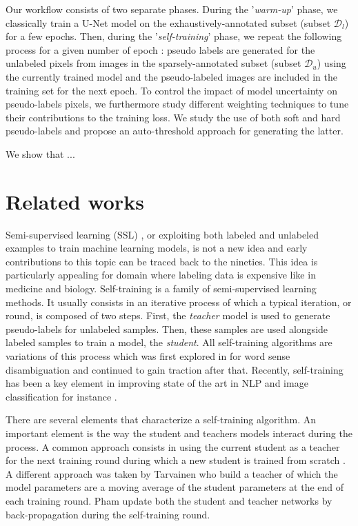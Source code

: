 Our workflow consists of two separate phases. During the '\textit{warm-up}' phase, we classically train a U-Net model on the exhaustively-annotated subset (subset $\mathcal{D}_l$) for a few epochs. Then, during the '\textit{self-training}' phase, we repeat the following process for a given number of epoch : pseudo labels are generated for the unlabeled pixels from images in the sparsely-annotated subset (subset $\mathcal{D}_u$) using the currently trained model and the pseudo-labeled images are included in the training set for the next epoch. To control the impact of model uncertainty on pseudo-labels pixels, we furthermore study different weighting techniques to tune their contributions to the training loss. We study the use of both soft and hard pseudo-labels and propose an auto-threshold approach for generating the latter. 

We show that ... 


\section{Related works}
\label{sec:relatedworks}

Semi-supervised learning (SSL) \cite{zhu2005semi, van2020survey}, or exploiting both labeled and unlabeled examples to train machine learning models, is not a new idea and early contributions to this topic can be traced back to the nineties. This idea is particularly appealing for domain where labeling data is expensive like in medicine and biology. Self-training is a family of semi-supervised learning methods. It usually consists in an iterative process of which a typical iteration, or round, is composed of two steps. First, the \textit{teacher} model is used to generate pseudo-labels for unlabeled samples. Then, these samples are used alongside labeled samples to train a model, the \textit{student}. All self-training algorithms are variations of this process which was first explored in \cite{yarowsky1995unsupervised} for word sense disambiguation and continued to gain traction after that. Recently, self-training has been a key element in improving state of the art in NLP and image classification for instance .

There are several elements that characterize a self-training algorithm. An important element is the way the student and teachers models interact during the process. A common approach consists in using the current student as a teacher for the next training round during which a new student is trained from scratch \cite{yarowsky1995unsupervised, xie2020self}. A different approach was taken by Tarvainen \etal \cite{tarvainen2017mean} who build a teacher of which the model parameters are a moving average of the student parameters at the end of each training round. Pham \etal \cite{pham2021meta} update both the student and teacher networks by back-propagation during the self-training round. 

